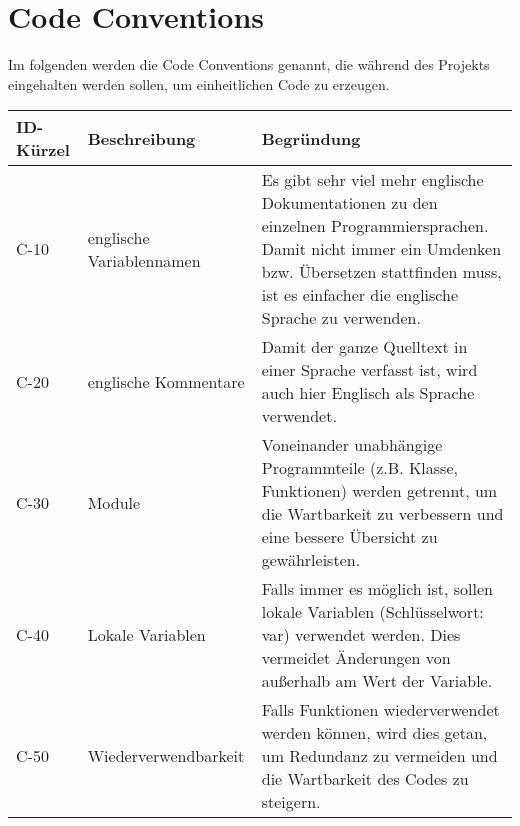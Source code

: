 

\chapter{Code Conventions}
Im folgenden werden die Code Conventions genannt, die während des Projekts eingehalten werden sollen, um einheitlichen Code zu erzeugen.


\begin{tabularx}{\textwidth}{|l|X|X|}
    \toprule
    \textbf{ID-Kürzel} & \textbf{Beschreibung} & \textbf{Begründung}\\
    \midrule
    \endhead
    \hline
    \caption{Code Conventions}
    
    \endfoot
    C-10 & englische Variablennamen &  Es gibt sehr viel mehr englische Dokumentationen zu den einzelnen Programmiersprachen. Damit nicht immer ein Umdenken bzw. Übersetzen stattfinden muss, ist es einfacher die englische Sprache zu verwenden.\\ \hline
    C-20 & englische Kommentare & Damit der ganze Quelltext in einer Sprache verfasst ist, wird auch hier Englisch als Sprache verwendet.  \\ \hline
    C-30 & Module & Voneinander unabhängige Programmteile (z.B. Klasse, Funktionen) werden getrennt, um die Wartbarkeit zu verbessern und eine bessere Übersicht zu gewährleisten.  \\ \hline
    C-40 & Lokale Variablen & Falls immer es möglich ist, sollen lokale Variablen (Schlüsselwort: var) verwendet werden. Dies vermeidet Änderungen von außerhalb am Wert der Variable.\\ \hline
    C-50 & Wiederverwendbarkeit & Falls Funktionen wiederverwendet werden können, wird dies getan, um Redundanz zu vermeiden und die Wartbarkeit des Codes zu steigern.
  
\end{tabularx}



